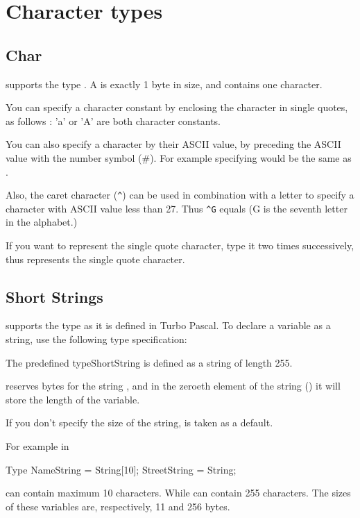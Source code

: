\documentclass{report}
\begin{document}
\section{Character types}
\subsection{Char}
\fpc supports the type . A  is exactly 1 byte in
size, and contains one character. 

You can specify a character constant by enclosing the character in single 
quotes, as follows : 'a' or 'A' are both character constants. 

You can also specify a character by their ASCII
value, by preceding the ASCII value with the number symbol (\#). For example
specifying  would be the same as .

Also, the caret character (\verb+^+) can be used in combination with a letter to
specify a character with ASCII value less than 27. Thus \verb+^G+ equals
 (G is the seventh letter in the alphabet.)

If you want to represent the single quote character, type it two times
successively, thus  represents the single quote character.

\subsection{Short Strings}
\fpc supports the  type as it is defined in Turbo Pascal.
To declare a variable as a string, use the following type specification:



The predefined type{ShortString} is defined as a string of length 255.

\fpc reserves  bytes for the string , and in the zeroeth
element of the string () it will store the length of the variable.

If you don't specify the size of the string,  is taken as a
default.

For example in 
\begin{listing}
Type
   NameString = String[10];
   StreetString = String;
\end{listing}
 can contain maximum 10 characters. While 
 can contain 255 characters. The sizes of these variables
are, respectively, 11 and 256 bytes.
 
\end{document}
